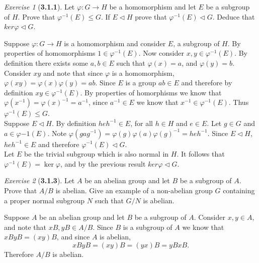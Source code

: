 \documentclass[12pt]{amsart}
\makeatletter
\theoremstyle{remark}
\newtheorem*{exercise}{Exercise}%
\renewenvironment{proof}[1][\proofname]{\par\doublespacing
  \pushQED{\qed}%
  \normalfont \topsep6\p@\@plus6\p@\relax
  \list{}{%
    \settowidth{\leftmargin}{\itshape\proofname:\hskip\labelsep}%
    \setlength{\labelwidth}{0pt}%
    \setlength{\itemindent}{-\leftmargin}%
  }%
  \item[\hskip\labelsep\itshape#1\@addpunct{:}]\ignorespaces
}{%
  \popQED\endlist\@endpefalse
  \singlespacing
}
\theoremstyle{mycomment}
\makeatother
\begin{document}
\begin{exercise}[\textbf{3.1.1}] Let $\varphi : G \to H$ be a homomorphism and let $E$ be a subgroup of $H$. Prove that $\varphi^{-1}(E) \leq G$. 
  If $E\lhd H$ prove that $\varphi^{-1}(E)\lhd G$. Deduce that $ker \varphi \lhd G$.
  \begin{proof} Suppose $\varphi : G \to H$ is a homomorphism and consider $E$, a subgroup of $H$. By properties of homomorphisms $1 \in \varphi^{-1}(E)$. Now consider 
    $x, y \in \varphi^{-1}(E)$. By definition there exists some $a, b \in E$ such that $\varphi(x) = a$, and $\varphi(y) = b$. Consider $xy$ and note that since $\varphi$ is a homomorphism, 
    $\varphi(xy) = \varphi(x)\varphi(y) = ab$. Since $E$ is a group $ab \in E$ and therefore by definition $xy \in \varphi^{-1}(E)$. By properties of homorphisms we know that 
    $\varphi(x^{-1}) = \varphi(x)^{-1} = a^{-1}$, since $a^{-1} \in E$ we know that $x^{-1} \in \varphi^{-1}(E)$. Thus $\varphi^{-1}(E) \leq G$. \\

    Suppose $E\lhd H$. By definition $heh^{-1} \in E$, for all $h \in H$ and $e \in E$. Let $g \in G$ and $a \in \varphi{-1}(E)$. Note 
    $\varphi(gag^{-1}) = \varphi(g)\varphi(a)\varphi(g)^{-1} = heh^{-1}$. Since $E\lhd H$, $heh^{-1} \in E$ and therefore $\varphi^{-1}(E)\lhd G$.\\

   Let $E$ be the trivial subgroup which is also normal in $H$. It follows that $\varphi^{-1}(E) = \ker \varphi$, and by the previous result $ker \varphi \lhd G$. 
  \end{proof}

\end{exercise}
\vspace{.15in}


\begin{exercise}[\textbf{3.1.3}] Let $A$ be an abelian group and let $B$ be a subgroup of $A$. Prove that $A/B$ is abelian. Give an 
  example of a non-abelian group $G$ containing a proper normal subgroup $N$ such that $G/N$ is abelian.\\

    \begin{proof} Suppose $A$ be an abelian group and let $B$ be a subgroup of $A$. Consider $x, y \in A$, and note that 
      $xB, yB \in A/B$. Since $B$ is a subgroup of $A$ we know that $xByB = (xy)B$, and since $A$ is abelian, 
      \begin{equation*}
        xByB = (xy)B = (yx)B = yBxB.
      \end{equation*}
      Therefore $A/B$ is abelian.
      \end{proof}

\end{exercise}
\vspace{.15in}
\end{document}
